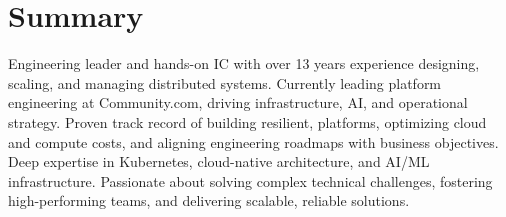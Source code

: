 \documentclass[]{resume}
\begin{document}
%
%

%
%

\begin{minipage}[t]{0.65\textwidth}


\section{Summary}
Engineering leader and hands-on IC with over 13 years experience designing, scaling, and managing distributed systems. Currently leading platform engineering at Community.com, driving infrastructure, AI, and operational strategy. Proven track record of building resilient, platforms, optimizing cloud and compute costs, and aligning engineering roadmaps with business objectives. Deep expertise in Kubernetes, cloud-native architecture, and AI/ML infrastructure. Passionate about solving complex technical challenges, fostering high-performing teams, and delivering scalable, reliable solutions.
\sectionsep


\end{minipage}
\end{document}
